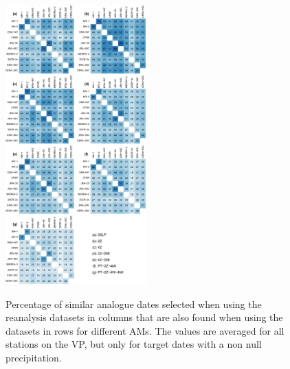 \documentclass[twocolumn]{svjour3}       %
\begin{document}
	\begin{figure}
		\includegraphics[width=0.48\textwidth]{figure-supp-dates-thres-0.pdf}\\
		\caption{Percentage of similar analogue dates selected when using the reanalysis datasets in columns that are also found when using the datasets in rows for different AMs. The values are averaged for all stations on the VP, but only for target dates with a non null precipitation.}
		\label{fig:similarities_analogue_dates_0}
	\end{figure}
	
\end{document}
